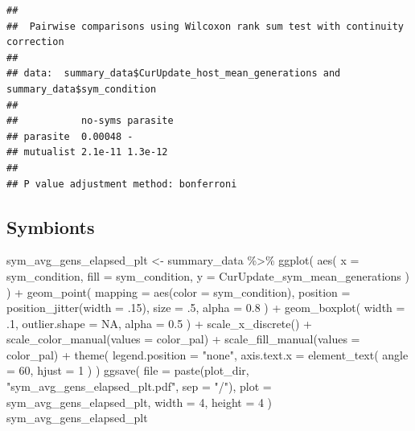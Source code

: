 \documentclass[
]{book}
\newenvironment{Shaded}{\begin{snugshade}}{\end{snugshade}}
\newcommand{\AttributeTok}[1]{\textcolor[rgb]{0.77,0.63,0.00}{#1}}
\newcommand{\ConstantTok}[1]{\textcolor[rgb]{0.00,0.00,0.00}{#1}}
\newcommand{\DecValTok}[1]{\textcolor[rgb]{0.00,0.00,0.81}{#1}}
\newcommand{\FloatTok}[1]{\textcolor[rgb]{0.00,0.00,0.81}{#1}}
\newcommand{\FunctionTok}[1]{\textcolor[rgb]{0.00,0.00,0.00}{#1}}
\newcommand{\NormalTok}[1]{#1}
\newcommand{\OtherTok}[1]{\textcolor[rgb]{0.56,0.35,0.01}{#1}}
\newcommand{\SpecialCharTok}[1]{\textcolor[rgb]{0.00,0.00,0.00}{#1}}
\newcommand{\StringTok}[1]{\textcolor[rgb]{0.31,0.60,0.02}{#1}}
\begin{document}
\begin{verbatim}
## 
##  Pairwise comparisons using Wilcoxon rank sum test with continuity correction 
## 
## data:  summary_data$CurUpdate_host_mean_generations and summary_data$sym_condition 
## 
##           no-syms parasite
## parasite  0.00048 -       
## mutualist 2.1e-11 1.3e-12 
## 
## P value adjustment method: bonferroni
\end{verbatim}

\hypertarget{symbionts-1}{%
\subsection{Symbionts}\label{symbionts-1}}

\begin{Shaded}
\begin{Highlighting}[]
\NormalTok{sym\_avg\_gens\_elapsed\_plt }\OtherTok{\textless{}{-}}\NormalTok{ summary\_data }\SpecialCharTok{\%\textgreater{}\%}
  \FunctionTok{ggplot}\NormalTok{(}
    \FunctionTok{aes}\NormalTok{(}
      \AttributeTok{x =}\NormalTok{ sym\_condition,}
      \AttributeTok{fill =}\NormalTok{ sym\_condition,}
      \AttributeTok{y =}\NormalTok{ CurUpdate\_sym\_mean\_generations}
\NormalTok{    )}
\NormalTok{  ) }\SpecialCharTok{+}
  \FunctionTok{geom\_point}\NormalTok{(}
    \AttributeTok{mapping =} \FunctionTok{aes}\NormalTok{(}\AttributeTok{color =}\NormalTok{ sym\_condition),}
    \AttributeTok{position =} \FunctionTok{position\_jitter}\NormalTok{(}\AttributeTok{width =}\NormalTok{ .}\DecValTok{15}\NormalTok{),}
    \AttributeTok{size =}\NormalTok{ .}\DecValTok{5}\NormalTok{,}
    \AttributeTok{alpha =} \FloatTok{0.8}
\NormalTok{  ) }\SpecialCharTok{+}
  \FunctionTok{geom\_boxplot}\NormalTok{(}
    \AttributeTok{width =}\NormalTok{ .}\DecValTok{1}\NormalTok{,}
    \AttributeTok{outlier.shape =} \ConstantTok{NA}\NormalTok{,}
    \AttributeTok{alpha =} \FloatTok{0.5}
\NormalTok{  ) }\SpecialCharTok{+}
  \FunctionTok{scale\_x\_discrete}\NormalTok{() }\SpecialCharTok{+}
  \FunctionTok{scale\_color\_manual}\NormalTok{(}\AttributeTok{values =}\NormalTok{ color\_pal) }\SpecialCharTok{+}
  \FunctionTok{scale\_fill\_manual}\NormalTok{(}\AttributeTok{values =}\NormalTok{ color\_pal) }\SpecialCharTok{+}
  \FunctionTok{theme}\NormalTok{(}
    \AttributeTok{legend.position =} \StringTok{"none"}\NormalTok{,}
    \AttributeTok{axis.text.x =} \FunctionTok{element\_text}\NormalTok{(}
      \AttributeTok{angle =} \DecValTok{60}\NormalTok{,}
      \AttributeTok{hjust =} \DecValTok{1}
\NormalTok{    )}
\NormalTok{  )}
\FunctionTok{ggsave}\NormalTok{(}
  \AttributeTok{file =} \FunctionTok{paste}\NormalTok{(plot\_dir, }\StringTok{"sym\_avg\_gens\_elapsed\_plt.pdf"}\NormalTok{, }\AttributeTok{sep =} \StringTok{"/"}\NormalTok{),}
  \AttributeTok{plot =}\NormalTok{ sym\_avg\_gens\_elapsed\_plt,}
  \AttributeTok{width =} \DecValTok{4}\NormalTok{,}
  \AttributeTok{height =} \DecValTok{4}
\NormalTok{)}
\NormalTok{sym\_avg\_gens\_elapsed\_plt}
\end{Highlighting}
\end{Shaded}
\end{document}
